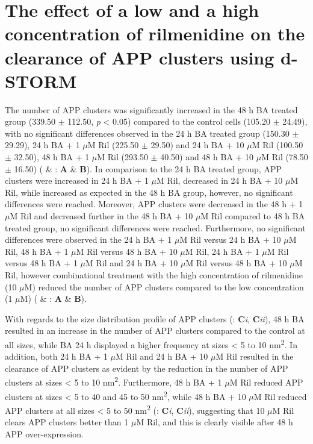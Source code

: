 \section{The effect of a low and a high concentration of rilmenidine on the clearance of APP clusters using d-STORM}
The number of APP clusters was significantly increased in the 48 h BA treated group (339.50 $\pm$ 112.50, \textit{p} < 0.05) compared to the control cells (105.20 $\pm$ 24.49), with no significant differences observed in the 24 h BA treated group (150.30 $\pm$ 29.29), 24 h BA + 1 $\mu$M Ril (225.50 $\pm$ 29.50) and 24 h BA + 10 $\mu$M Ril (100.50 $\pm$ 32.50), 48 h BA + 1 $\mu$M Ril (293.50 $\pm$ 40.50) and 48 h BA + 10 $\mu$M Ril (78.50 $\pm$ 16.50) ( \& : \textbf{A} \& \textbf{B}). In comparison to the 24 h BA treated group, APP clusters were increased in 24 h BA + 1 $\mu$M Ril, decreased in 24 h BA + 10 $\mu$M Ril, while increased as expected in the 48 h BA group, however, no significant differences were reached. Moreover, APP clusters were decreased in the 48 h + 1 $\mu$M Ril and decreased further in the 48 h BA + 10 $\mu$M Ril compared to 48 h BA treated group, no significant differences were reached. Furthermore, no significant differences were observed in the 24 h BA + 1 $\mu$M Ril versus 24 h BA + 10 $\mu$M Ril, 48 h BA + 1 $\mu$M Ril versus 48 h BA + 10 $\mu$M Ril, 24 h BA + 1 $\mu$M Ril versus 48 h BA + 1 $\mu$M Ril and 24 h BA + 10 $\mu$M Ril versus 48 h BA + 10 $\mu$M Ril, however combinational treatment with the high concentration of rilmenidine (10 $\mu$M) reduced the number of APP clusters compared to the low concentration (1 $\mu$M)  ( \& : \textbf{A} \& \textbf{B}).

With regards to the size distribution profile of APP clusters (: \textbf{C}\textit{i}, \textbf{C}\textit{ii}), 48 h BA resulted in an increase in the number of APP clusters compared to the control at all sizes, while BA 24 h displayed a higher frequency at sizes < 5 to 10 nm\textsuperscript{2}. In addition, both 24 h BA + 1 $\mu$M Ril and 24 h BA + 10 $\mu$M Ril resulted in the clearance of APP clusters as evident by the reduction in the number of APP clusters at sizes < 5 to 10 nm\textsuperscript{2}. Furthermore, 48 h BA + 1 $\mu$M Ril reduced APP clusters at sizes < 5 to 40 and 45 to 50 nm\textsuperscript{2}, while 48 h BA + 10 $\mu$M Ril reduced APP clusters at all sizes < 5 to 50 nm\textsuperscript{2}  (: \textbf{C}\textit{i}, \textbf{C}\textit{ii}), suggesting that 10 $\mu$M Ril clears APP clusters better than 1 $\mu$M Ril, and this is clearly visible after 48 h APP over-expression.

